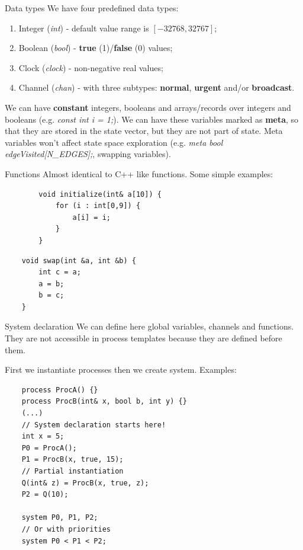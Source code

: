\documentclass{beamer}
\begin{document}
\begin{frame}{Data types}
	We have four predefined data types:
	\begin{enumerate}
		\item Integer (\textit{int}) - default value range is $[-32768, 32767]$;
		\item Boolean (\textit{bool}) - \textbf{true} (1)/\textbf{false} (0) values;
		\item Clock (\textit{clock}) - non-negative real values;
		\item Channel (\textit{chan}) - with three subtypes: \textbf{normal}, \textbf{urgent} and/or \textbf{broadcast}.
	\end{enumerate}
	We can have \textbf{constant} integers, booleans and arrays/records over integers and booleans (e.g. \textit{const int i = 1;}).\newline
	We can have these variables marked as \textbf{meta}, so that they are stored in the state vector, but they are not part of state. Meta variables won't affect state space exploration (e.g. \textit{meta bool edgeVisited[N\_EDGES];}, swapping variables).
\end{frame}

\begin{frame}[fragile]{Functions}
	Almost identical to C++ like functions. Some simple examples:
	\small
	\begin{verbatim}
		void initialize(int& a[10]) {
		    for (i : int[0,9]) {
		        a[i] = i;
		    }
		}
	\end{verbatim}
	
	\begin{verbatim}
	void swap(int &a, int &b) {
	    int c = a;
	    a = b;
	    b = c;
	}
	\end{verbatim}
	
\end{frame}

\begin{frame}[fragile]{System declaration}
	We can define here global variables, channels and functions. They are not accessible in process templates because they are defined before them.
	
	First we instantiate processes then we create system. Examples:
	
	\tiny{
	\begin{verbatim}
	process ProcA() {}
	process ProcB(int& x, bool b, int y) {}
	(...)
	// System declaration starts here!
	int x = 5;
	P0 = ProcA();
	P1 = ProcB(x, true, 15);
	// Partial instantiation
	Q(int& z) = ProcB(x, true, z);
	P2 = Q(10);
	
	system P0, P1, P2;
	// Or with priorities
	system P0 < P1 < P2;
	\end{verbatim}}
\end{frame}
\end{document}
